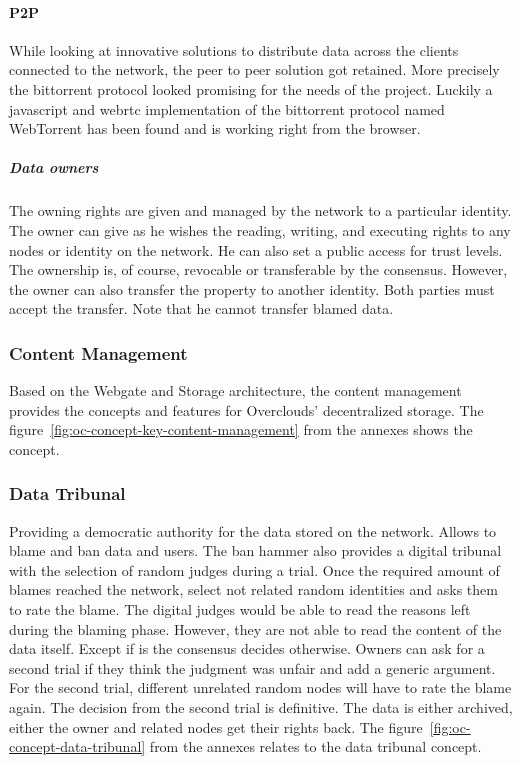 \paragraph{P2P} While looking at innovative solutions to distribute data across the clients connected to the network, the peer to peer solution got retained. More precisely the bittorrent protocol looked promising for the needs of the project. Luckily a javascript and webrtc implementation of the bittorrent protocol named WebTorrent\cite{Torrent2015WebTorrent} has been found and is working right from the browser.

\subparagraph{Data owners} The owning rights are given and managed by the network to a particular identity. The owner can give as he wishes the reading, writing, and executing rights to any nodes or identity on the network. He can also set a public access for trust levels. The ownership is, of course, revocable or transferable by the consensus. However, the owner can also transfer the property to another identity. Both parties must accept the transfer. Note that he cannot transfer blamed data.

\subsubsection{Content Management} Based on the Webgate and Storage architecture, the content management provides the concepts and features for Overclouds' decentralized storage. The figure~\ref{fig:oc-concept-key-content-management} from the annexes shows the concept.

\subsubsection{Data Tribunal} Providing a democratic authority for the data stored on the network. Allows to blame and ban data and users. The ban hammer also provides a digital tribunal with the selection of random judges during a trial. Once the required amount of blames reached the network, select not related random identities and asks them to rate the blame. The digital judges would be able to read the reasons left during the blaming phase. However, they are not able to read the content of the data itself. Except if is the consensus decides otherwise. Owners can ask for a second trial if they think the judgment was unfair and add a generic argument. For the second trial, different unrelated random nodes will have to rate the blame again. The decision from the second trial is definitive. The data is either archived, either the owner and related nodes get their rights back. The figure~\ref{fig:oc-concept-data-tribunal} from the annexes relates to the data tribunal concept.

